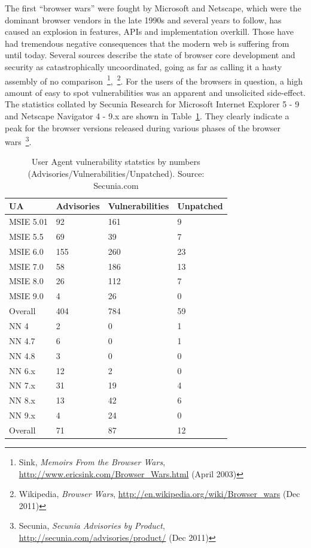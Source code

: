     The first ``browser wars'' were fought by Microsoft and Netscape, which were the dominant browser vendors in the late 1990s and several years to follow, has caused an explosion in features, APIs and implementation overkill. Those have had tremendous negative consequences that the modern web is suffering from until today. Several sources describe the state of browser core development and security as catastrophically uncoordinated, going as far as calling it a hasty assembly of no comparison~\footnote{Sink, \textit{Memoirs From the Browser Wars}, \url{http://www.ericsink.com/Browser_Wars.html} (April 2003)},~\footnote{Wikipedia, \textit{Browser Wars}, \url{http://en.wikipedia.org/wiki/Browser_wars} (Dec 2011)}. For the users of the browsers in question, a high amount of easy to spot vulnerabilities was an apparent and unsolicited side-effect. The statistics collated by Secunia Research for Microsoft Internet Explorer 5 - 9 and Netscape Navigator 4 - 9.x are shown in Table~\ref{tbl:ua-vuln-stats}. They 
clearly indicate a peak for the browser versions released during various phases of the browser wars~\footnote{Secunia, \textit{Secunia Advisories by Product}, \url{http://secunia.com/advisories/product/} (Dec 2011)}.\\

\begin{table}
  \centering
    \begin{tabular}{| l | l | l | l |}
    \hline
    UA & Advisories & Vulnerabilities & Unpatched  \\ \hline
    MSIE 5.01 & 92 & 161  & 9 \\ \hline
    MSIE 5.5  & 69 & 39  & 7 \\ \hline
    MSIE 6.0  & 155 & 260  & 23 \\ \hline
    MSIE 7.0  & 58 & 186  & 13 \\ \hline
    MSIE 8.0  & 26 & 112  & 7 \\ \hline
    MSIE 9.0  & 4 & 26  & 0 \\ \hline \hline
    Overall   & 404 & 784 & 59 \\ \hline\hline
    NN 4  & 2 & 0  & 1 \\ \hline
    NN 4.7  & 6 & 0  & 1 \\ \hline
    NN 4.8  & 3 & 0  & 0 \\ \hline
    NN 6.x  & 12 & 2  & 0 \\ \hline
    NN 7.x  & 31 & 19  & 4 \\ \hline
    NN 8.x  & 13 & 42  & 6 \\ \hline
    NN 9.x  & 4 & 24  & 0 \\ \hline \hline
    Overall & 71 & 87 & 12 \\ \hline
    \end{tabular}
    \label{tbl:ua-vuln-stats}
    \caption{User Agent vulnerability statstics by numbers (Advisories/Vulnerabilities/Unpatched). Source: Secunia.com}
\end{table}


